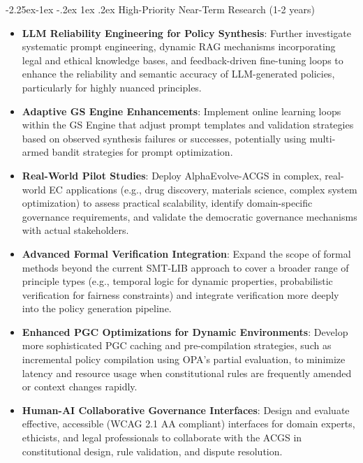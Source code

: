 \documentclass[manuscript,screen,review,anonymous,9pt]{acmart}
\makeatletter
\renewcommand\subsection{\@startsection{subsection}{2}{\z@}%
  {-2.25ex\@plus -1ex \@minus -.2ex}%
  {1ex \@plus .2ex}%
  {\normalfont\large\bfseries}}
\makeatother
\begin{document}
\subsection{High-Priority Near-Term Research (1-2 years)}
\label{subsec:near_term_research}
\begin{itemize}[leftmargin=*,itemsep=1pt,parsep=1pt]
    \item \textbf{LLM Reliability Engineering for Policy Synthesis}: Further investigate systematic prompt engineering, dynamic RAG mechanisms incorporating legal and ethical knowledge bases, and feedback-driven fine-tuning loops to enhance the reliability and semantic accuracy of LLM-generated policies, particularly for highly nuanced principles.
    \item \textbf{Adaptive GS Engine Enhancements}: Implement online learning loops within the GS Engine that adjust prompt templates and validation strategies based on observed synthesis failures or successes, potentially using multi-armed bandit strategies for prompt optimization.
    \item \textbf{Real-World Pilot Studies}: Deploy AlphaEvolve-ACGS in complex, real-world EC applications (e.g., drug discovery, materials science, complex system optimization) to assess practical scalability, identify domain-specific governance requirements, and validate the democratic governance mechanisms with actual stakeholders.
    \item \textbf{Advanced Formal Verification Integration}: Expand the scope of formal methods beyond the current SMT-LIB approach to cover a broader range of principle types (e.g., temporal logic for dynamic properties, probabilistic verification for fairness constraints) and integrate verification more deeply into the policy generation pipeline.
    \item \textbf{Enhanced PGC Optimizations for Dynamic Environments}: Develop more sophisticated PGC caching and pre-compilation strategies, such as incremental policy compilation using OPA's partial evaluation, to minimize latency and resource usage when constitutional rules are frequently amended or context changes rapidly.
    \item \textbf{Human-AI Collaborative Governance Interfaces}: Design and evaluate effective, accessible (WCAG 2.1 AA compliant) interfaces for domain experts, ethicists, and legal professionals to collaborate with the ACGS in constitutional design, rule validation, and dispute resolution.
\end{itemize}
\end{document}
